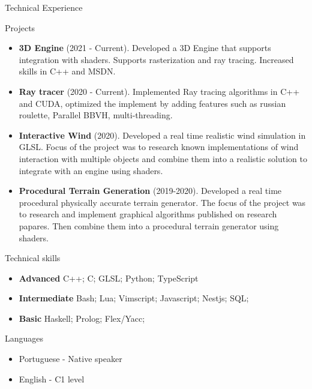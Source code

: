 \documentclass[]{mcdowellcv}
\begin{document}
	\begin{cvsection}{Technical Experience}
		\begin{cvsubsection}{Projects}{}{}
			\begin{itemize}
				\item \textbf{3D Engine} (2021 - Current).  Developed a 3D Engine that supports integration with shaders. Supports rasterization and ray tracing. Increased skills in C++ and MSDN.
				\item \textbf{Ray tracer} (2020 - Current). Implemented Ray tracing algorithms in C++ and CUDA, optimized the implement by adding features such as russian roulette, Parallel BBVH, multi-threading.
				\item \textbf{Interactive Wind} (2020). Developed a real time realistic wind simulation in GLSL. Focus of the project was to research known implementations of wind interaction with multiple objects and combine them into a realistic solution to integrate with an engine using shaders.
				\item \textbf{Procedural Terrain Generation} (2019-2020). Developed a real time procedural physically accurate terrain generator. The focus of the project was to research and implement graphical algorithms published on research papares. Then combine them into a procedural terrain generator using shaders.


			\end{itemize}
		\end{cvsubsection}
	\end{cvsection}

	\begin{cvsection}{Technical skills}
		\begin{cvsubsection}{}{}{}
			\begin{itemize}
				\item \textbf{Advanced} C++; C; GLSL; Python; TypeScript
				\item \textbf{Intermediate} Bash; Lua; Vimscript; Javascript; Nestjs; SQL;
				\item \textbf{Basic} Haskell; Prolog; Flex/Yacc;
			\end{itemize}
		\end{cvsubsection}
	\end{cvsection}

	\begin{cvsection}{Languages}
		\begin{cvsubsection}{}{}{}
			\begin{itemize}
				\item Portuguese - Native speaker
				\item English - C1 level
			\end{itemize}
		\end{cvsubsection}
	\end{cvsection}
\end{document}
